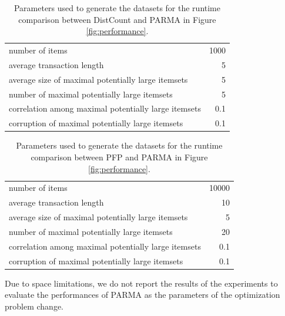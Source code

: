 \begin{table}[tb] \centering
\begin{tabular}{ l  r } \hline number of items & 1000 \\ 
average transaction length & 5 \\ 
average size of maximal potentially large itemsets & 5 \\ 
number of maximal potentially large itemsets & 5 \\
correlation among maximal potentially large itemsets & 0.1 \\
corruption of maximal potentially large itemsets & 0.1 \\ \hline
\end{tabular}
  \caption{Parameters used to generate the datasets for the runtime comparison between 
  DistCount and PARMA in Figure \ref{fig:performance}.}
  \label{tab:param1}
\end{table}

\begin{table}[tb] \centering
\begin{tabular}{ l  r } 
\hline 
number of items & 10000 \\ 
average transaction length & 10 \\ 
average size of maximal potentially large itemsets & 5 \\ 
number of maximal potentially large itemsets & 20 \\
correlation among maximal potentially large itemsets & 0.1 \\
corruption of maximal potentially large itemsets & 0.1 \\ 
\hline
\end{tabular}
  \caption{Parameters used to generate the datasets for the runtime comparison
  between PFP and PARMA in Figure \ref{fig:performance}.}
  \label{tab:param2}
\end{table}
Due to space limitations, we do not report the results of the experiments to
evaluate the performances of PARMA as the parameters of the optimization problem change.

